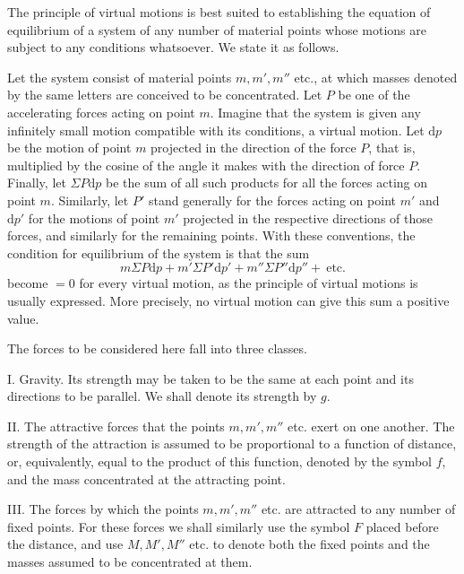 The principle of virtual motions is best suited to establishing the equation of equilibrium of a system of any number of material points whose motions are subject to any conditions whatsoever. We state it as follows.

Let the system consist of material points $m,m',m''$ etc., at which masses denoted by the same letters are conceived to be concentrated. Let $P$ be one of the accelerating forces acting on point $m$. Imagine that the system is given any infinitely small motion compatible with its conditions, a virtual motion. Let $\mathrm{d}p$ be the motion of point $m$ projected in the direction of the force $P$, that is, multiplied by the cosine of the angle it makes with the direction of force $P$. Finally, let $\Sigma P\mathrm{d}p$ be the sum of all such products for all the forces acting on point $m$. Similarly, let $P'$ stand generally for the forces acting on point $m'$ and $\mathrm{d}p'$ for the motions of point $m'$ projected in the respective directions of those forces, and similarly for the remaining points. With these conventions, the condition for equilibrium of the system is that the sum
\[
m\Sigma P\mathrm{d}p+m'\Sigma P'\mathrm{d}p'+m''\Sigma P''\mathrm{d}p''+\ \text{etc.}
\]
become $=0$ for every virtual motion, as the principle of virtual motions is usually expressed. More precisely, no virtual motion can give this sum a positive value.

The forces to be considered here fall into three classes.

I. Gravity. Its strength may be taken to be the same at each point and its directions to be parallel. We shall denote its strength by $g$.

II. The attractive forces that the points $m,m',m''$ etc. exert on one another. The strength of the attraction is assumed to be proportional to a function of distance, or, equivalently, equal to the product of this function, denoted by the symbol $f$, and the mass concentrated at the attracting point.

III. The forces by which the points $m,m',m''$ etc. are attracted to any number of fixed points. For these forces we shall similarly use the symbol $F$ placed before the distance, and use $M,M',M''$ etc. to denote both the fixed points and the masses assumed to be concentrated at them.


